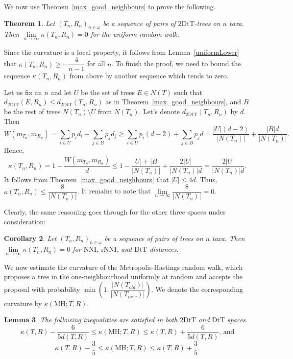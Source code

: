 \documentclass{amsart}
\newtheorem{lemma}{Lemma}
\newtheorem{corollary}[lemma]{Corollary}
\newtheorem{theorem}[lemma]{Theorem}
\newcommand{\dts}{\mathrm{2DtT}}
\newcommand{\nni}{\mathrm{NNI}}
\newcommand{\rnni}{\mathrm{rNNI}}
\newcommand{\mdts}{\mathrm{DtT}}
\newcommand{\MH}{\mathrm{MH}}
\begin{document}
We now use Theorem~\ref{max_good_neighbours} to prove the following.


\begin{theorem}\label{zero-in-the-limit}
Let $(T_n,R_n)_{n\in\omega}$ be a sequence of pairs of $\dts$-trees on $n$ taxa.
Then $\lim\limits_{n \to \infty}\kappa(T_n,R_n) = 0$ for the uniform random walk.
\end{theorem}

\proof
Since the curvature is a local property, it follows from Lemma~\ref{uniformLower} that $\kappa(T_n,R_n) \geq -\dfrac{4}{n-1}$ for all $n$.
To finish the proof, we need to bound the sequence $\kappa(T_n,R_n)$ from above by another sequence which tends to zero.

Let us fix an $n$ and let $U$ be the set of trees $E \in N(T)$ such that $d_\dts(E,R_n) \leq d_\dts(T_n,R_n)$ as in Theorem~\ref{max_good_neighbours}, and $B$ be the rest of trees $N(T_n)\setminus U$ from $N(T_n)$.
Let's denote $d_\dts(T_n,R_n)$ by $d$.
Then
\[
W(m_{T_n},m_{R_n}) = \sum_{i\in U} p_i d_i + \sum_{j\in B} p_j d_j \geq
\sum_{i\in U} p_i (d-2) + \sum_{j\in B} p_j d =
\frac{|U|(d-2)}{|N(T_n)|} + \frac{|B|d}{|N(T_n)|}.
\]
Hence,
\[
\kappa(T_n,R_n) = 1 - \frac{W(m_{T_n},m_{R_n})}{d} \leq
1 - \frac{|U| + |B|}{|N(T_n)|} + \frac{2|U|}{|N(T_n)|d}
= \frac{2|U|}{|N(T_n)|d}.
\]
It follows from Theorem~\ref{max_good_neighbours} that $|U| \leq 4d$.
Thus, $\kappa(T_n,R_n) \leq \dfrac{8}{|N(T_n)|}$.
It remains to note that $\lim\limits_{n\to\infty}\dfrac{8}{|N(T_n)|} = 0$.
\endproof

Clearly, the same reasoning goes through for the other three spaces under consideration:

\begin{corollary}
Let $(T_n,R_n)_{n\in\omega}$ be a sequence of pairs of trees on $n$ taxa.
Then $\lim\limits_{n \to \infty}\kappa(T_n,R_n) = 0$ for $\nni$, $\rnni$, and $\mdts$ distances.
\end{corollary}

We now estimate the curvature of the Metropolis-Hastings random walk, which proposes a tree in the one-neighbourhood uniformly at random and accepts the proposal with probability $\min\left(1, \dfrac{|N(T_{old})|}{|N(T_{new})|}\right)$.
We denote the corresponding curvature by $\kappa(\MH;T,R)$.

\begin{lemma}
The following inequalities are satisfied in both $\dts$ and $\mdts$ spaces.
\[
\kappa(T,R) - \dfrac{6}{5d(T,R)} \leq \kappa(\MH;T,R) \leq \kappa(T,R) +
\dfrac{6}{5d(T,R)}\mbox{, and}
\]
\[
\kappa(T,R) - \dfrac35 \leq \kappa(\MH;T,R) \leq \kappa(T,R) + \dfrac35.
\]
\end{lemma}
\end{document}

